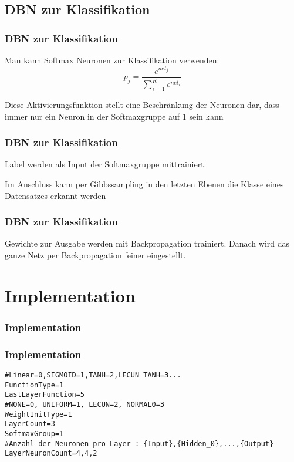 \documentclass[12pt,titlepage]{beamer}
\begin{document}
	\subsection{DBN zur Klassifikation}
	\begin{frame}
	\frametitle{DBN zur Klassifikation}
	Man kann Softmax Neuronen zur Klassifikation verwenden:
	$$p_j = \frac{e^{net_j}}{\sum_{i=1}^K e^{net_i}}$$
	
	Diese Aktivierungsfunktion stellt eine Beschränkung der Neuronen dar, dass immer nur ein Neuron in der Softmaxgruppe auf 1 sein kann
	\end{frame}
	\begin{frame}
	\frametitle{DBN zur Klassifikation}
	\begin{figure}[H]
	\center
	
\end{figure}
	Label werden als Input der Softmaxgruppe mittrainiert.
	
	Im Anschluss kann per Gibbssampling in den letzten Ebenen die Klasse eines Datensatzes erkannt werden
	\end{frame}
	\begin{frame}
	\frametitle{DBN zur Klassifikation}
	\begin{figure}[H]
	\center
	
\end{figure}
	Gewichte zur Ausgabe werden mit Backpropagation trainiert. Danach wird das ganze Netz per Backpropagation feiner eingestellt.
	\end{frame}
	\section{Implementation}
	\begin{frame}
	\frametitle{Implementation}	
\begin{figure}[H]
	\center
	
\end{figure}
	\end{frame}

\begin{frame}[fragile]
	\frametitle{Implementation}	
		\begin{lstlisting}
#Linear=0,SIGMOID=1,TANH=2,LECUN_TANH=3...
FunctionType=1
LastLayerFunction=5
#NONE=0, UNIFORM=1, LECUN=2, NORMAL0=3
WeightInitType=1
LayerCount=3
SoftmaxGroup=1
#Anzahl der Neuronen pro Layer : {Input},{Hidden_0},...,{Output}
LayerNeuronCount=4,4,2

\end{lstlisting} 
	\end{frame}
\end{document}
